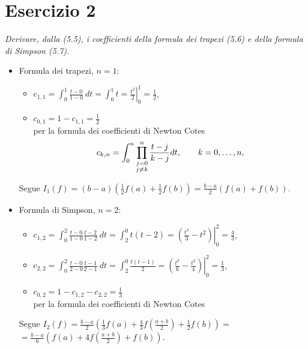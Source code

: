 \section{Esercizio 2}
\label{sub:es2}
\emph{Derivare, dalla (5.5), i coefficienti della formula dei trapezi (5.6) e della formula di Simpson (5.7).}
\begin{sol}
	\begin{itemize}
		\item Formula dei trapezi, $n=1$:
			\begin{itemize}
				\item $c_{1,1}=\int_0^1{\frac{t-0}{1-0}\:dt}=\int_0^1{t}=\left.\frac{t^2}{2}\right|_0^1=\frac{1}{2}$,\\
				\item $c_{0,1}=1-c_{1,1}=\frac{1}{2}$ \\
				per la formula dei coefficienti di Newton Cotes\\
				\vspace{1em}
				\begin{equation}
					c_{k,n}=\int_0^n \prod_{
						\begin{subarray}{c}
							j=0\\
							j\neq k
						\end{subarray}
						}^{n}\frac{t-j}{k-j} dt, \qquad k=0,\dots,n,
				\end{equation}
			\end{itemize}
			Segue $I_1(f)=(b-a)\left(\frac{1}{2}f(a)+\frac{1}{2}f(b)\right)=\frac{b-a}{2}\left(f(a)+f(b)\right)$.
		\item Formula di Simpson, $n=2$:
			\begin{itemize}
				\item $c_{1,2}=\int_0^2{\frac{t-0}{1-0}\frac{t-2}{1-2}\:dt}=\int_2^0{t(t-2)}=\left.\left(\frac{t^3}{3}-t^2\right)\right|_0^2=\frac{4}{3}$,
				\item $c_{2,2}=\int_0^2{\frac{t-0}{2-0}\frac{t-1}{2-1}\:dt}=\int_2^0{\frac{t(t-1)}{2}}=\left.\left(\frac{t^3}{6}-\frac{t^2}{4}\right)\right|_0^2=\frac{1}{3}$,
				\item $c_{0,2}=1-c_{1,2}-c_{2,2}=\frac{1}{3}$\\
				per la formula dei coefficienti di Newton Cotes
			\end{itemize}
			Segue $I_2(f)=\frac{b-a}{2}\left(\frac{1}{3}f(a)+\frac{4}{3}f\left(\frac{a+b}{2}\right)+\frac{1}{2}f(b)\right)=$\\ $=\frac{b-a}{6}\left(f(a)+4f\left(\frac{a+b}{2}\right)+f(b)\right)$.
	\end{itemize}
\end{sol}

